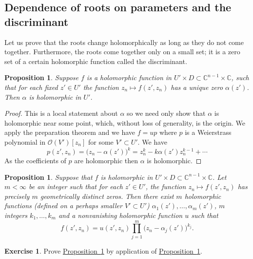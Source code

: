 \documentclass[12pt,openany]{book}
\newcommand{\C}{{\mathbb{C}}}
\newcommand{\sO}{{\mathcal{O}}}
\theoremstyle{plain}
\newtheorem{prop}[thm]{Proposition}
\theoremstyle{remark}
\theoremstyle{definition}
\theoremstyle{exercise}
\newtheorem{exercise}{Exercise}[section]
\theoremstyle{example}
\newcommand{\propref}[1]{\hyperref[#1]{Proposition~\ref*{#1}}}
\begin{document}
\subsection{Dependence of roots on parameters and the discriminant}

Let us prove that the roots change holomorphically as long as they do not
come together.  Furthermore, the roots come together
only on a small set; it is a zero set of a certain holomorphic function
called the discriminant.

\begin{prop} \label{prop:roothol}
Suppose $f$ is a holomorphic function in $U' \times D \subset \C^{n-1}
\times \C$, such that for each fixed $z' \in U'$ the function
$z_n \mapsto f(z',z_n)$ has a unique zero $\alpha(z')$.  Then $\alpha$ is
holomorphic in $U'$.
\end{prop}

\begin{proof}
This is a local statement about $\alpha$ so we need only show
that $\alpha$ is holomorphic near some point, which, without loss
of generality, is the origin.
We apply the preparation
theorem and we have $f = u p$
where $p$ is a
Weierstrass polynomial in $\sO(V')[z_n]$ for some $V' \subset U'$.
We have
\begin{equation}
p(z',z_n) = {\bigl(z_n-\alpha(z') \bigr)}^k = z_n^k - k \alpha(z') z_n^{k-1}
+ \cdots
\end{equation}
As the coefficients of $p$ are holomorphic then $\alpha$ is holomorphic.
\end{proof}

\begin{prop} \label{prop:rootshol}
Suppose that $f$ is holomorphic in $U' \times D \subset \C^{n-1} \times \C$.
Let $m < \infty$ be an integer such that
for each $z' \in U'$, the function $z_n \mapsto f(z',z_n)$ has
precisely $m$ geometrically distinct zeros.
Then there exist $m$ holomorphic functions (defined on a perhaps
smaller $V' \subset U'$)
$\alpha_1(z'),\ldots,\alpha_m(z')$, $m$ integers $k_1,\ldots,k_m$
and a nonvanishing holomorphic function $u$
such that
\begin{equation*}
f(z',z_n) = u(z',z_n) \prod_{j=1}^m {\bigl( z_n - \alpha_j(z') \bigr)}^{k_j}
.
\end{equation*}
\end{prop}

\begin{exercise}
Prove \propref{prop:rootshol} by application of
\propref{prop:roothol}.
\end{exercise}
\end{document}
